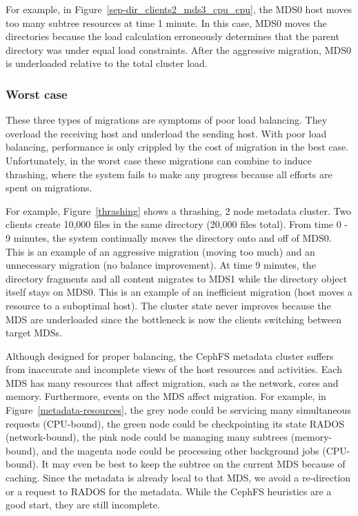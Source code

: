 For example, in Figure~\ref{sep-dir_clients2_mds3_cpu_cpu}, the MDS0 host moves too many subtree resources at time 1 minute. In this case, MDS0 moves the directories because the load calculation erroneously determines that the parent directory was under equal load constraints. After the aggressive migration, MDS0 is underloaded relative to the total cluster load. 

\subsubsection*{Worst case}
These three types of migrations are symptoms of poor load balancing. They overload the receiving host and underload the sending host. With poor load balancing, performance is only crippled by the cost of migration in the best case. Unfortunately, in the worst case these migrations can combine to induce thrashing, where the system fails to make any progress because all efforts are spent on migrations. 

For example, Figure~\ref{thrashing} shows a thrashing, 2 node metadata cluster. Two clients create 10,000 files in the same directory (20,000 files total). From time 0 - 9 minutes, the system continually moves the directory onto and off of MDS0. This is an example of an aggressive migration (moving too much) and an unnecessary migration (no balance improvement).  At time 9 minutes, the directory fragments and all content migrates to MDS1 while the directory object itself stays on MDS0. This is an example of an inefficient migration (host moves a resource to a suboptimal host). The cluster state never improves because the MDS are underloaded since the bottleneck is now the clients switching between target MDSs. 

Although designed for proper balancing, the CephFS metadata cluster suffers from inaccurate and incomplete views of the host resources and activities. Each MDS has many resources  that affect migration, such as the network, cores and memory. Furthermore, events on the MDS affect migration. For example, in Figure~\ref{metadata-resources}, the grey node could be servicing many simultaneous requests (CPU-bound), the green node could be checkpointing its state RADOS (network-bound), the pink node could be managing many subtrees (memory-bound), and the magenta node could be processing other background jobs (CPU-bound). It may even be best to keep the  subtree on the current MDS because of caching. Since the metadata is already local to that MDS, we avoid a re-direction or a request to RADOS for the metadata. While the CephFS heuristics are a good start, they are still incomplete. 


